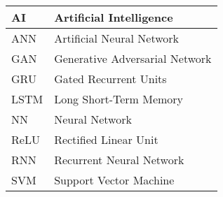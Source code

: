 \begin{center}
    \renewcommand{\arraystretch}{1.5}
    \begin{tabularx}{0.8\textwidth} {
        | >{\raggedright\arraybackslash}X 
        | >{\raggedright\arraybackslash}X 
        | }
        \hline
        AI & Artificial Intelligence \\
        \hline
        ANN & Artificial Neural Network \\
        \hline
        GAN & Generative Adversarial Network \\
        \hline
        GRU & Gated Recurrent Units \\
        \hline
        LSTM & Long Short-Term Memory \\
        \hline
        NN & Neural Network \\
        \hline
        ReLU & Rectified Linear Unit \\
        \hline
        RNN & Recurrent Neural Network \\
        \hline
        SVM & Support Vector Machine \\
        \hline
    \end{tabularx}
\end{center}
